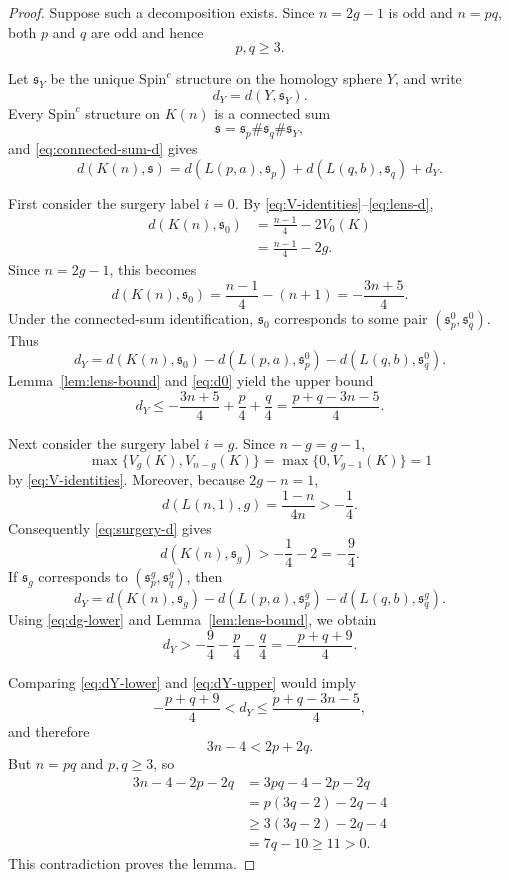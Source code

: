 \documentclass[11pt]{article}
\theoremstyle{definition}
\theoremstyle{remark}
\newcommand{\SpinC}{\mathrm{Spin}^{c}}
\begin{document}
\begin{proof}
Suppose such a decomposition exists.  Since $n=2g-1$ is odd and $n=pq$,
both $p$ and $q$ are odd and hence
\begin{equation}\label{eq:pq-lower}
p,q\ge 3.
\end{equation}

Let $\mathfrak s_Y$ be the unique $\SpinC$ structure on the homology sphere
$Y$, and write
\[
d_Y=d(Y,\mathfrak s_Y).
\]
Every $\SpinC$ structure on $K(n)$ is a connected sum
\[
\mathfrak s=\mathfrak s_p\#\mathfrak s_q\#\mathfrak s_Y,
\]
and \eqref{eq:connected-sum-d} gives
\[
d(K(n),\mathfrak s)
=
d(L(p,a),\mathfrak s_p)
+
d(L(q,b),\mathfrak s_q)
+
d_Y.
\]

First consider the surgery label $i=0$.  By
\eqref{eq:V-identities}--\eqref{eq:lens-d},
\[
\begin{aligned}
d(K(n),\mathfrak s_0)
&=
\frac{n-1}{4}-2V_0(K)\\
&=
\frac{n-1}{4}-2g.
\end{aligned}
\]
Since $n=2g-1$, this becomes
\begin{equation}\label{eq:d0}
d(K(n),\mathfrak s_0)
=
\frac{n-1}{4}-(n+1)
=
-\frac{3n+5}{4}.
\end{equation}
Under the connected-sum identification, $\mathfrak s_0$ corresponds to some
pair $(\mathfrak s_p^0,\mathfrak s_q^0)$.  Thus
\[
d_Y
=
d(K(n),\mathfrak s_0)
-
d(L(p,a),\mathfrak s_p^0)
-
d(L(q,b),\mathfrak s_q^0).
\]
Lemma~\ref{lem:lens-bound} and \eqref{eq:d0} yield the upper bound
\begin{equation}\label{eq:dY-upper}
d_Y
\le
-\frac{3n+5}{4}+\frac p4+\frac q4
=
\frac{p+q-3n-5}{4}.
\end{equation}

Next consider the surgery label $i=g$.  Since $n-g=g-1$,
\[
\max\{V_g(K),V_{n-g}(K)\}
=
\max\{0,V_{g-1}(K)\}
=
1
\]
by \eqref{eq:V-identities}.  Moreover, because $2g-n=1$,
\[
d(L(n,1),g)
=
\frac{1-n}{4n}
>
-\frac14.
\]
Consequently \eqref{eq:surgery-d} gives
\begin{equation}\label{eq:dg-lower}
d(K(n),\mathfrak s_g)
>
-\frac14-2
=
-\frac94.
\end{equation}
If $\mathfrak s_g$ corresponds to
$(\mathfrak s_p^g,\mathfrak s_q^g)$, then
\[
d_Y
=
d(K(n),\mathfrak s_g)
-
d(L(p,a),\mathfrak s_p^g)
-
d(L(q,b),\mathfrak s_q^g).
\]
Using \eqref{eq:dg-lower} and Lemma~\ref{lem:lens-bound}, we obtain
\begin{equation}\label{eq:dY-lower}
d_Y
>
-\frac94-\frac p4-\frac q4
=
-\frac{p+q+9}{4}.
\end{equation}

Comparing \eqref{eq:dY-lower} and \eqref{eq:dY-upper} would imply
\[
-\frac{p+q+9}{4}
<
d_Y
\le
\frac{p+q-3n-5}{4},
\]
and therefore
\[
3n-4<2p+2q.
\]
But $n=pq$ and $p,q\ge3$, so
\[
\begin{aligned}
3n-4-2p-2q
&=
3pq-4-2p-2q\\
&=
p(3q-2)-2q-4\\
&\ge 3(3q-2)-2q-4\\
&=7q-10\ge 11>0.
\end{aligned}
\]
This contradiction proves the lemma.
\end{proof}
\end{document}
